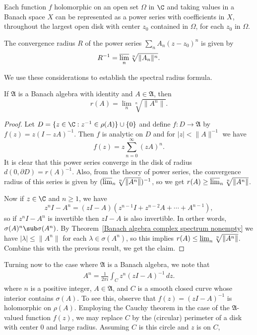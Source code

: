 \begin{theorem}
Each function $f$ holomorphic on an open set $\Omega$ in $\C$ and taking values in a Banach space $X$ can be represented as a power series with coefficients in $X$, throughout the largest open disk with center $z_0$ contained in $\Omega$, for each $z_0$ in $\Omega$.
\end{theorem}
\begin{theorem}
The convergence radius $R$ of the power series $\sum_nA_n(z-z_0)^n$ is given by
\[R^{-1}=\varlimsup_n\sqrt[n]{\|A_n\|^n}.\]
\end{theorem}
We use these considerations to establish the spectral radius formula.
\begin{proposition}\label{spectral radius formula}
If $\mathfrak{A}$ is a Banach algebra with identity and $A\in\mathfrak{A}$, then
\[r(A)=\lim_n\sqrt[n]{\|A^n\|}.\]
\end{proposition}
\begin{proof}
Let $D=\{z\in\C:z^{-1}\in\rho(A)\}\cup\{0\}$ and define $f:D\to\mathfrak{A}$ by $f(z)=z(I-zA)^{-1}$. Then $f$ is analytic on $D$ and for $|z|<\|A\|^{-1}$ we have
\[f(z)=z\sum_{n=0}^{\infty}(zA)^n.\]
It is clear that this power series converge in the disk of radius $d(0,\partial D)=r(A)^{-1}$. Also, from the theory of power series, the convergence radius of this series is given by $(\varlimsup_n\sqrt[n]{\|A^n\|})^{-1}$, so we get $r(A)\geq \varlimsup_n\sqrt[n]{\|A^n\|}$.\par
Now if $z\in\C$ and $n\geq 1$, we have
\[z^nI-A^n=(zI-A)(z^{n-1}I+z^{n-2}A+\cdots+A^{n-1}),\]
so if $z^nI-A^n$ is invertible then $zI-A$ is also invertible. In orther words, $\sigma(A)^n\sub\sigma(A^n)$. By Theorem~\ref{Banach algebra complex spectrum nonempty} we have $|\lambda|\leq\|A^n\|$ for each $\lambda\in\sigma(A^n)$, so this implies $r(A)\leq\varliminf_n\sqrt[n]{\|A^n\|}$. Combine this with the previous result, we get the claim.
\end{proof}
Turning now to the case where $\mathfrak{A}$ is a Banach algebra, we note that
\begin{align}\label{Banach algebra A^n=integral}
A^n=\frac{1}{2\pi i}\int_Cz^n(zI-A)^{-1}\,dz.
\end{align}
where $n$ is a positive integer, $A\in\mathfrak{A}$, and $C$ is a smooth closed curve whose interior contains $\sigma(A)$. To see this, observe that $f(z)=(zI-A)^{-1}$ is holomorphic on $\rho(A)$. Employing the Cauchy theorem in the case of the $\mathfrak{A}$-valued function $f(z)$, we may replace $C$ by the (circular) perimeter of a disk with center $0$ and large radius. Assuming $C$ is this circle and $z$ is on $C$,

